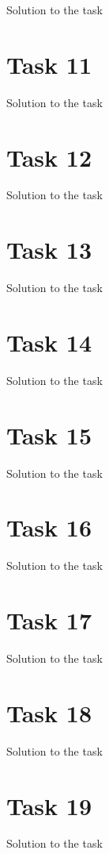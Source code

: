 \documentclass[a4paper,12pt,oneside,onecolumn]{article} %
\begin{document}
Solution to the task

\section*{Task 11}

Solution to the task

\section*{Task 12}

Solution to the task

\section*{Task 13}

Solution to the task

\section*{Task 14}

Solution to the task

\section*{Task 15}

Solution to the task

\section*{Task 16}

Solution to the task

\section*{Task 17}

Solution to the task

\section*{Task 18}

Solution to the task

\section*{Task 19}

Solution to the task
\end{document}
